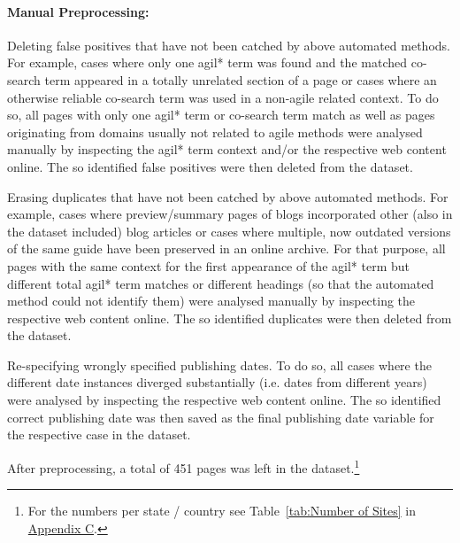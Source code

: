 \paragraph{Manual Preprocessing:}
\begin{compactitem}
\item Deleting false positives that have not been catched by above automated methods. For example, cases where only one agil* term was found and the matched co-search term appeared in a totally unrelated section of a page or cases where an otherwise reliable co-search term was used in a non-agile related context. To do so, all pages with only one agil* term or co-search term match as well as pages originating from domains usually not related to agile methods were analysed manually by inspecting the agil* term context and/or the respective web content online. The so identified false positives were then deleted from the dataset.
\item Erasing duplicates that have not been catched by above automated methods. For example, cases where preview/summary pages of blogs incorporated other (also in the dataset included) blog articles or cases where multiple, now outdated versions of the same guide have been preserved in an online archive. For that purpose, all pages with the same context for the first appearance of the agil* term but different total agil* term matches or different headings (so that the automated method could not identify them) were analysed manually by inspecting the respective web content online. The so identified duplicates were then deleted from the dataset.
\item Re-specifying wrongly specified publishing dates. To do so, all cases where the different date instances diverged substantially (i.e. dates from different years) were analysed by inspecting the respective web content online. The so identified correct publishing date was then saved as the final publishing date variable for the respective case in the dataset. 
\end{compactitem}

\noindent
After preprocessing, a total of 451 pages was left in the dataset.\footnote{For the numbers per state / country see Table~\ref{tab:Number of Sites} in \hyperref[Appendix C]{Appendix C}.}


